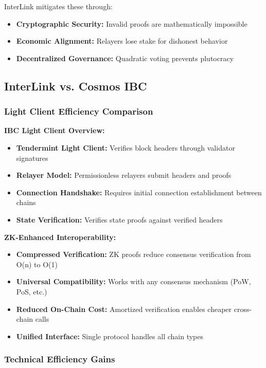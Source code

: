 \documentclass[11pt,a4paper]{article}
\begin{document}
InterLink mitigates these through:
\begin{itemize}
    \item \textbf{Cryptographic Security:} Invalid proofs are mathematically impossible
    \item \textbf{Economic Alignment:} Relayers lose stake for dishonest behavior
    \item \textbf{Decentralized Governance:} Quadratic voting prevents plutocracy
\end{itemize}

\subsection{InterLink vs. Cosmos IBC}

\subsubsection{Light Client Efficiency Comparison}

\textbf{IBC Light Client Overview:}
\begin{itemize}
    \item \textbf{Tendermint Light Client:} Verifies block headers through validator signatures
    \item \textbf{Relayer Model:} Permissionless relayers submit headers and proofs
    \item \textbf{Connection Handshake:} Requires initial connection establishment between chains
    \item \textbf{State Verification:} Verifies state proofs against verified headers
\end{itemize}

\textbf{ZK-Enhanced Interoperability:}
\begin{itemize}
    \item \textbf{Compressed Verification:} ZK proofs reduce consensus verification from O(n) to O(1)
    \item \textbf{Universal Compatibility:} Works with any consensus mechanism (PoW, PoS, etc.)
    \item \textbf{Reduced On-Chain Cost:} Amortized verification enables cheaper cross-chain calls
    \item \textbf{Unified Interface:} Single protocol handles all chain types
\end{itemize}

\subsubsection{Technical Efficiency Gains}
\end{document}
